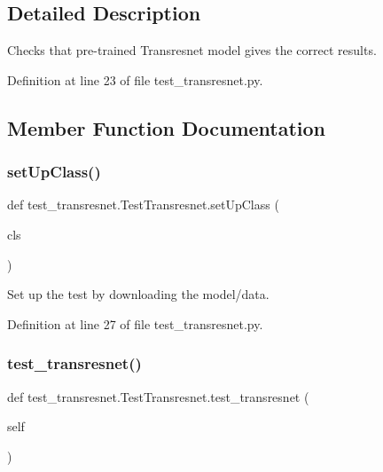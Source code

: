 \subsection{Detailed Description}
\begin{DoxyVerb}Checks that pre-trained Transresnet model gives the correct results.\end{DoxyVerb}
 

Definition at line 23 of file test\+\_\+transresnet.\+py.



\subsection{Member Function Documentation}
\mbox{\label{classtest__transresnet_1_1TestTransresnet_aafc17231f7444de8b09ff767920e8f85}} 
\subsubsection{\texorpdfstring{set\+Up\+Class()}{setUpClass()}}
{\footnotesize\ttfamily def test\+\_\+transresnet.\+Test\+Transresnet.\+set\+Up\+Class (\begin{DoxyParamCaption}\item[{}]{cls }\end{DoxyParamCaption})}

\begin{DoxyVerb}Set up the test by downloading the model/data.\end{DoxyVerb}
 

Definition at line 27 of file test\+\_\+transresnet.\+py.

\mbox{\label{classtest__transresnet_1_1TestTransresnet_a6e1645b6a63146c1757aed9057b44d5e}} 
\subsubsection{\texorpdfstring{test\+\_\+transresnet()}{test\_transresnet()}}
{\footnotesize\ttfamily def test\+\_\+transresnet.\+Test\+Transresnet.\+test\+\_\+transresnet (\begin{DoxyParamCaption}\item[{}]{self }\end{DoxyParamCaption})}

